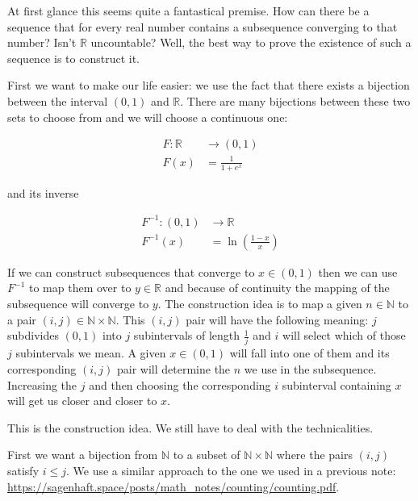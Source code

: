 \begin{solution}
At first glance this seems quite a fantastical premise. How can there be a sequence that for every real number contains a subsequence converging to that number? Isn't $\mathbb{R}$ uncountable?
Well, the best way to prove the existence of such a sequence is to construct it.

First we want to make our life easier: we use the fact that there exists a bijection between the interval $(0, 1)$ and $\mathbb{R}$. There are many bijections between these two sets to choose from and we will choose a continuous one:

\begin{align*}
  F: \mathbb{R} &\to (0, 1) \\
  F(x) &= \frac{1}{1 + e^x} 
\end{align*}

and its inverse

\begin{align*}
  F^{-1}: (0, 1) &\to \mathbb{R} \\
  F^{-1}(x) &= \ln(\frac{1 - x}{x}) 
\end{align*}

If we can construct subsequences that converge to $x \in (0, 1)$ then we can use $F^{-1}$ to map them over to $y \in \mathbb{R}$ and because of continuity the mapping of the subsequence will converge to $y$. The construction idea is to map a given $n \in \mathbb{N}$ to a pair $(i, j) \in \mathbb{N} \times \mathbb{N}$. This $(i, j)$ pair will have the following meaning: $j$ subdivides $(0, 1)$ into $j$ subintervals of length $\frac{1}{j}$ and $i$ will select which of those $j$ subintervals we mean. A given $x \in (0, 1)$ will fall into one of them and its corresponding $(i, j)$ pair will determine the $n$ we use in the subsequence. Increasing the $j$ and then choosing the corresponding $i$ subinterval containing $x$ will get us closer and closer to $x$.

This is the construction idea. We still have to deal with the technicalities.

First we want a bijection from $\mathbb{N}$ to a subset of $\mathbb{N} \times \mathbb{N}$ where the pairs $(i, j)$ satisfy $i \leq j$. We use a similar approach to the one we used in a previous note: \url{https://sagenhaft.space/posts/math_notes/counting/counting.pdf}.


\end{solution}

